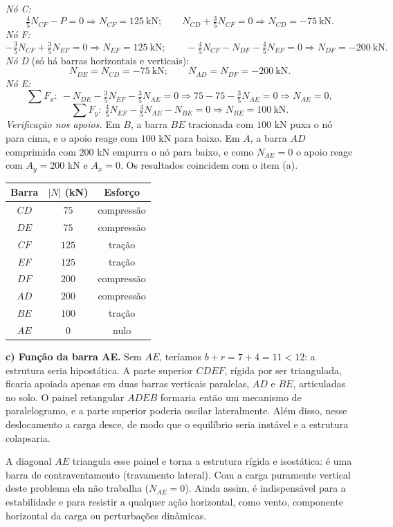 \documentclass{article}%
\begin{document}
\emph{Nó C:}
\[
\tfrac45 N_{CF}-P=0\Rightarrow N_{CF}=125\ \text{kN};\qquad N_{CD}+\tfrac35N_{CF}=0\Rightarrow N_{CD}=-75\ \text{kN}.
\]
\emph{Nó F:}
\[
-\tfrac35N_{CF}+\tfrac35N_{EF}=0\Rightarrow N_{EF}=125\ \text{kN};\qquad
-\tfrac45N_{CF}-N_{DF}-\tfrac45N_{EF}=0\Rightarrow N_{DF}=-200\ \text{kN}.
\]
\emph{Nó D} (só há barras horizontais e verticais):
\[
N_{DE}=N_{CD}=-75\ \text{kN};\qquad N_{AD}=N_{DF}=-200\ \text{kN}.
\]
\emph{Nó E:}
\[
\textstyle\sum F_x:\ -N_{DE}-\tfrac35N_{EF}-\tfrac35N_{AE}=0\Rightarrow 75-75-\tfrac35N_{AE}=0\Rightarrow N_{AE}=0,
\]
\[
\textstyle\sum F_y:\ \tfrac45N_{EF}-\tfrac45N_{AE}-N_{BE}=0\Rightarrow N_{BE}=100\ \text{kN}.
\]
\emph{Verificação nos apoios.} Em $B$, a barra $BE$ tracionada com $100$ kN puxa o nó para cima, e o apoio reage com $100$ kN para baixo. Em $A$, a barra $AD$ comprimida com $200$ kN empurra o nó para baixo, e como $N_{AE}=0$ o apoio reage com $A_y=200$ kN e $A_x=0$. Os resultados coincidem com o item (a).

\begin{center}
\begin{tabular}{c|c|c}
Barra & $|N|$ (kN) & Esforço\\ \hline
$CD$ & $75$ & compressão\\
$DE$ & $75$ & compressão\\
$CF$ & $125$ & tração\\
$EF$ & $125$ & tração\\
$DF$ & $200$ & compressão\\
$AD$ & $200$ & compressão\\
$BE$ & $100$ & tração\\
$AE$ & $0$ & nulo
\end{tabular}
\end{center}

\textbf{c) Função da barra AE.} Sem $AE$, teríamos $b+r=7+4=11<12$: a estrutura seria hipostática. A parte superior $CDEF$, rígida por ser triangulada, ficaria apoiada apenas em duas barras verticais paralelas, $AD$ e $BE$, articuladas no solo. O painel retangular $ADEB$ formaria então um mecanismo de paralelogramo, e a parte superior poderia oscilar lateralmente. Além disso, nesse deslocamento a carga desce, de modo que o equilíbrio seria instável e a estrutura colapsaria.

A diagonal $AE$ triangula esse painel e torna a estrutura rígida e isostática: é uma barra de contraventamento (travamento lateral). Com a carga puramente vertical deste problema ela não trabalha ($N_{AE}=0$). Ainda assim, é indispensável para a estabilidade e para resistir a qualquer ação horizontal, como vento, componente horizontal da carga ou perturbações dinâmicas.
\end{document}
